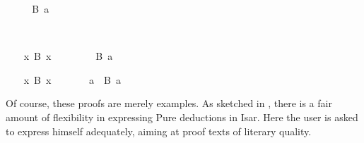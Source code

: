 \begin{isabellebody}
\begin{minipage}[t]{0.4\textwidth}
\isatagnoproof
{}\isamarkupfalse%
%
\endisatagnoproof
{\isafoldnoproof}%
%
\isadelimnoproof
\isanewline
%
\endisadelimnoproof
%
\isadelimproof
\ \ %
\endisadelimproof
%
\isatagproof
{}\isamarkupfalse%
\ \isamarkupfalse%
\ {\isachardoublequoteopen}B\ a{\isachardoublequoteclose}\ \isacommand{{\isachardot}{\isachardot}}\isamarkupfalse%
%
\end{minipage}\\[3ex]\begin{minipage}[t]{0.4\textwidth}
\isanewline
\ \ \isamarkupfalse%
\ {\isachardoublequoteopen}{\isasymexists}x{\isachardot}\ B\ x{\isachardoublequoteclose}\isanewline
\ \ \isamarkupfalse%
\isanewline
\ \ \ \ \isamarkupfalse%
\ {\isachardoublequoteopen}B\ a{\isachardoublequoteclose}%
\endisatagproof
{\isafoldproof}%
%
\isadelimproof
%
\endisadelimproof
%
\isadelimnoproof
\ %
\endisadelimnoproof
%
\isatagnoproof
{}\isamarkupfalse%
%
\endisatagnoproof
{\isafoldnoproof}%
%
\isadelimnoproof
\isanewline
%
\endisadelimnoproof
%
\isadelimproof
\ \ %
\endisadelimproof
%
\isatagproof
{}\isamarkupfalse%
%
\end{minipage}\qquad\begin{minipage}[t]{0.4\textwidth}
\isanewline
\ \ \isamarkupfalse%
\ {\isachardoublequoteopen}{\isasymexists}x{\isachardot}\ B\ x{\isachardoublequoteclose}%
\endisatagproof
{\isafoldproof}%
%
\isadelimproof
%
\endisadelimproof
%
\isadelimnoproof
\ %
\endisadelimnoproof
%
\isatagnoproof
{}\isamarkupfalse%
%
\endisatagnoproof
{\isafoldnoproof}%
%
\isadelimnoproof
\isanewline
%
\endisadelimnoproof
%
\isadelimproof
\ \ %
\endisadelimproof
%
\isatagproof
{}\isamarkupfalse%
\ \isamarkupfalse%
\ a\ \ {\isachardoublequoteopen}B\ a{\isachardoublequoteclose}\ \isacommand{{\isachardot}{\isachardot}}\isamarkupfalse%
%
\end{minipage}
%
\endisatagproof
{\isafoldproof}%
%
\isadelimproof
%
\endisadelimproof
%
\begin{isamarkuptext}%
\bigskip\noindent Of course, these proofs are merely examples.  As
  sketched in , there is a fair amount
  of flexibility in expressing Pure deductions in Isar.  Here the user
  is asked to express himself adequately, aiming at proof texts of
  literary quality.%
\end{isamarkuptext}%
\isamarkuptrue%
%
\isadelimvisible
%
\endisadelimvisible
%
\isatagvisible
{}\isamarkupfalse%
%
\endisatagvisible
{\isafoldvisible}%
%
\isadelimvisible
%
\endisadelimvisible
\isanewline
\end{isabellebody}%
